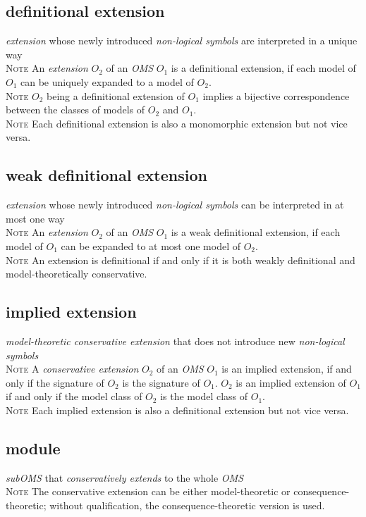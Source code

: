 \documentclass[10pt,%
\ifpretendfinal
final%
\else
draft%
\fi,
]{scrreprt}
\makeatletter
\newcommand*\CommentAuthor{}
\renewcommand*\CommentAuthor{#1}}
\newcommand*\CommentDate{}
\renewcommand*\CommentDate{#1}}
\newcommand*\CommentId{}
\renewcommand*\CommentId{#1}}
\newcommand*\CommentType{}
\renewcommand*\CommentType{#1}}
\newcommand*{\SetCommentColorByType}[1]{%
\edef\localType{{#1}}%
\expandafter\ifstrequal\localType{q-aut}{\colorlet{CommentColor}{red}}{%
\expandafter\ifstrequal\localType{q-all}{\colorlet{CommentColor}{orange}}{%
\expandafter\ifstrequal\localType{todo}{\colorlet{CommentColor}{orange}}{%
\expandafter\ifstrequal\localType{fyi}{\colorlet{CommentColor}{lightgray}}{%
\colorlet{CommentColor}{yellow}}}}}}
\newcommand*{\SetCommentPrefixByType}[1]{%
\edef\localType{{#1}}%
\expandafter\@ifmtarg\localType{%
\edef\CommentPrefix{}%
}{%
\caseupper[q]{#1}%
\edef\CommentPrefix{\thestring: }%
}}
\newcommand*{\initComment}[1]{%
\setkeys{Comment}{#1}%
\SetCommentColorByType{\CommentType}%
\relax%
\SetCommentPrefixByType{\CommentType}%
\relax%
}
\newcommand*{\todonote}[2][]{%
\initComment{#1}%
\pdfcomment[author=\CommentAuthor,color=CommentColor,date=\CommentDate,id=\CommentId]{%
\CommentPrefix
#2}}
\newcommand*{\todonoteURL}[1]{#1}
\renewcommand*{\todonote}[2][]{%
\initComment{#1}%
\ednote{\CommentPrefix #2}}
\renewcommand*{\todonoteURL}[1]{\url{#1}}
\newcommand*{\termref}[1]{\textit{#1}}
\newcommand{\termdefinition}[2]{\subsection*{#1}#2}
\newenvironment{definitions}[0]{\medskip }{}
\newenvironment{note}[0]{\ \\ \textsc{Note} \quad}{}
\makeatother
\begin{document}
\begin{definitions}
  \termdefinition{definitional extension}{\termref{extension} whose newly introduced
   \termref{non-logical symbols} are interpreted in a unique way}
  \begin{note}
An \termref{extension} $O_2$ of an \termref{OMS} $O_1$ is a definitional extension, if each model of $O_1$ can be uniquely expanded to a model of $O_2$.
  \end{note}
  \begin{note}
    $O_2$ being a definitional extension of $O_1$ implies a bijective correspondence between the classes of models of $O_2$ and $O_1$.
  \end{note}
  \begin{note}
    Each definitional extension is also a monomorphic extension but not vice versa.
  \end{note}

  \termdefinition{weak definitional extension}{\termref{extension} whose newly introduced
   \termref{non-logical symbols} can be interpreted in at most one way}
  \begin{note}
An \termref{extension} $O_2$ of an \termref{OMS} $O_1$ is a weak definitional extension, if each model of $O_1$ can be expanded to at most one model of $O_2$.
  \end{note}
  \begin{note}
    An extension is definitional if and only if it is both weakly definitional
   and model-theoretically conservative.
  \end{note}

  \termdefinition{implied extension}{\termref{model-theoretic conservative extension} that does not introduce new \termref{non-logical symbols}}
  \begin{note}
    A \termref{conservative extension} $O_2$ of an \termref{OMS}
    $O_1$ is an implied extension, if and only if the signature of
    $O_2$ is the signature of $O_1$.  $O_2$ is an implied extension of
    $O_1$ if and only if the model class of $O_2$ is the model class
    of $O_1$.
  \end{note}
  \begin{note}
    Each implied extension is also a definitional extension but not vice versa.
  \end{note}

  \termdefinition{module}{\termref{subOMS} that \termref{conservatively extends} to the whole \termref{OMS}}
  \begin{note}
    The conservative extension can be either model-theoretic or consequence-theoretic; without qualification, the consequence-theoretic version is used.
  \end{note}


\end{definitions}
\end{document}
